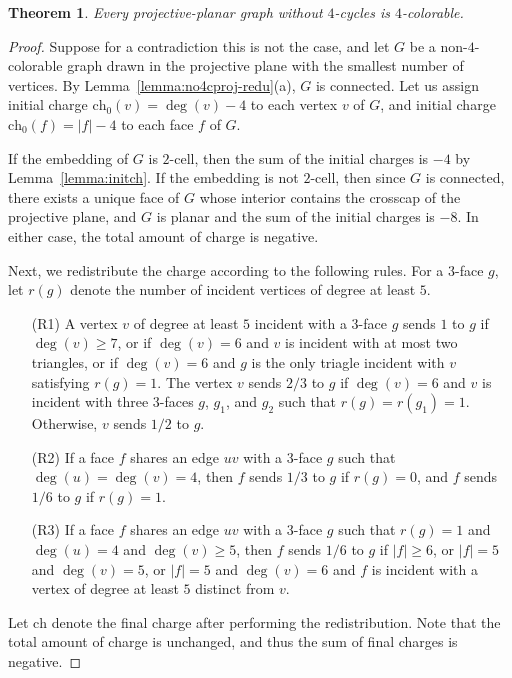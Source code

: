 \documentclass[12pt,twoside,openright,a4paper]{book}
\newtheorem{theorem}{Theorem}[chapter]
\newcommand{\initch}{\text{ch}_0}
\newcommand{\finch}{\text{ch}}
\begin{document}
\begin{theorem}\label{thm:no4cproj}
Every projective-planar graph without $4$-cycles is $4$-colorable.
\end{theorem}
\begin{proof}
Suppose for a contradiction this is not the case, and let $G$ be a
non-$4$-colorable graph drawn in the projective plane with
the smallest number of
vertices.  By Lemma~\ref{lemma:no4cproj-redu}(a), $G$ is connected.
Let us assign initial charge $\initch(v)=\deg(v)-4$ to each vertex $v$ of $G$,
and initial charge $\initch(f)=|f|-4$ to each face $f$ of $G$.

If the embedding of $G$ is $2$-cell, then the sum of the initial charges
is $-4$ by Lemma~\ref{lemma:initch}.  If the embedding is not $2$-cell, then
since $G$ is connected, there exists a unique face of $G$ whose interior contains
the crosscap of the projective plane, and $G$ is planar and the sum of the initial charges is $-8$.
In either case, the total amount of charge is negative.

Next, we redistribute the charge according to the following rules.
For a $3$-face $g$, let $r(g)$ denote the number of incident vertices of degree
at least $5$.
\begin{itemize}
\item[(R1)] A vertex $v$ of degree at least $5$ incident with a $3$-face $g$ sends $1$ to $g$
if $\deg(v)\ge 7$, or if $\deg(v)=6$ and $v$ is incident with at most two triangles,
or if $\deg(v)=6$ and $g$ is the only triagle incident with $v$ satisfying $r(g)=1$.
The vertex $v$ sends $2/3$ to $g$ if $\deg(v)=6$ and $v$ is incident with three $3$-faces $g$, $g_1$, and $g_2$
such that $r(g)=r(g_1)=1$.  Otherwise, $v$ sends $1/2$ to $g$.
\item[(R2)] If a face $f$ shares an edge $uv$ with a $3$-face $g$ such that $\deg(u)=\deg(v)=4$,
then $f$ sends $1/3$ to $g$ if $r(g)=0$, and $f$ sends $1/6$ to $g$ if $r(g)=1$.
\item[(R3)] If a face $f$ shares an edge $uv$ with a $3$-face $g$ such that $r(g)=1$ and $\deg(u)=4$ and $\deg(v)\ge 5$,
then $f$ sends $1/6$ to $g$ if $|f|\ge 6$, or $|f|=5$ and $\deg(v)=5$, or $|f|=5$ and $\deg(v)=6$ and $f$ is incident with a vertex of degree
at least $5$ distinct from $v$.
\end{itemize}
Let $\finch$ denote the final charge after performing the redistribution.
Note that the total amount of charge is unchanged, and thus the sum of
final charges is negative.


\end{proof}
\end{document}
